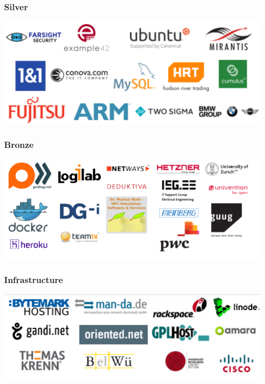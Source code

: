 \documentclass[t]{beamer}
\begin{document}
\begin{frame}
	\frametitle{Silver}
	\begin{center}
	\includegraphics[scale=0.5]{images2/sponsors/silver.pdf}
	\end{center}

\end{frame}

\begin{frame}
	\frametitle{Bronze}
	\begin{center}
	\includegraphics[scale=0.7]{images2/sponsors/bronze2.pdf}
	\end{center}
\end{frame}

\begin{frame}
	\frametitle{Infrastructure}
	\begin{center}
	\includegraphics[scale=0.7]{images2/sponsors/infrastructure.pdf}
	\end{center}

\end{frame}
\end{document}
